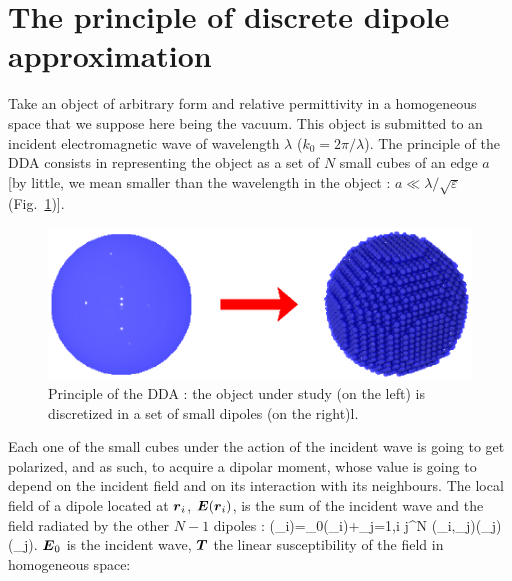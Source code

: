\section{The principle of discrete dipole approximation}

Take an object of arbitrary form and relative permittivity in a
homogeneous space that we suppose here being the vacuum. This object
is submitted to an incident electromagnetic wave of wavelength
$\lambda$ ($k_0=2\pi/\lambda$).  The principle of the DDA consists in
representing the object as a set of $N$ small cubes of an edge $a$ [by
little, we mean smaller than the wavelength in the object :
$a\ll \lambda/\sqrt{\varepsilon}$ (Fig.~\ref{discretisation})].
\begin{figure}
\begin{center}
\includegraphics*[draft=false,width=150mm]{discretisation.eps}
\caption{Principle of the DDA : the object under study (on the left)
  is discretized in a set of small dipoles (on the right)l.}
\label{discretisation}
\end{center}
\end{figure}
Each one of the small cubes under the action of the incident wave is
going to get polarized, and as such, to acquire a dipolar moment,
whose value is going to depend on the incident field and on its
interaction with its neighbours. The local field of a dipole located
at $\boldsymbol{r}_i$, $\boldsymbol{E}(\boldsymbol{r}_i)$, is the sum of the incident wave and
the field radiated by the other $N-1$ dipoles :
\be \label{cdms} (_i)=_0(_i)+\sum_{j=1,i\neq
j}^{N} (_i,_j)\alpha(_j)(_j). \ee
$\boldsymbol{E}_0$ is the incident wave, $\boldsymbol{T}$ the linear susceptibility of
the field in homogeneous space:
